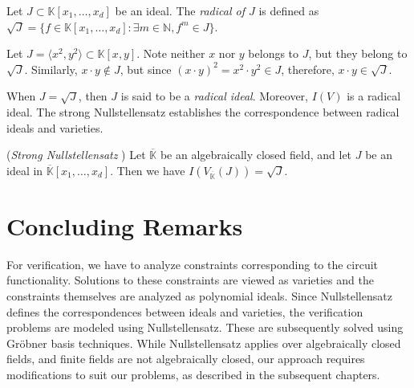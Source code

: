 \begin{Definition}\label{def:radical}
Let $J \subset \mathbb{K}[x_1,\dots, x_d]$ be an ideal. The {\it radical of $J$} is defined as $\sqrt{J} = \{f \in
\mathbb{K}[x_1,\dots, x_d]: \exists m \in \mathbb{N}, f^m \in J\}$. 
\end{Definition}

\begin{Example}
Let $J=\langle x^2,y^2\rangle \subset \mathbb{K}\left[x,y\right]$.
Note neither $x$ nor $y$ belongs to $J$, but they belong to $\sqrt J$.
Similarly, $x\cdot y \notin J$, but since $(x \cdot y)^{2}=x^{2}\cdot y^{2}\in J$, therefore,
$x\cdot y \in \sqrt J$. 
\end{Example} 

When $J = \sqrt J$, then $J$ is said to be a {\it radical
  ideal}. Moreover, $I(V)$ is a radical ideal. The strong
Nullstellensatz establishes the correspondence between radical ideals
and varieties. 

\begin{Theorem}\label{thm:sns}
({\it Strong Nullstellensatz} \cite{gb_book}) 
Let $\overline{\mathbb{K}}$ be an algebraically closed field, and let $J$
be an ideal in $\overline{\mathbb{K}}[x_1,\dots, x_d]$. Then we have $I(V_{\overline{\mathbb{K}}}(J)) =\sqrt{J}$. 
\end{Theorem}

\section{Concluding Remarks}
For verification, we have to analyze constraints corresponding to the circuit functionality.
Solutions to these constraints are viewed as varieties and the constraints themselves are
analyzed as polynomial ideals. Since Nullstellensatz defines the correspondences between ideals and varieties, 
the verification problems are modeled using Nullstellensatz. 
These are subsequently solved using Gr\"obner basis techniques. 
While Nullstellensatz applies over algebraically closed fields, 
and finite fields are not algebraically closed, our approach 
requires modifications to suit our problems, as described in the subsequent chapters.  




